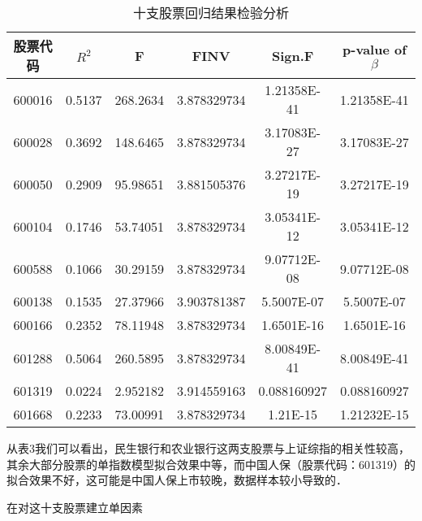 \begin{table}[ht]
\centering
\caption{十支股票回归结果检验分析}\label{inv9_tab3}
\begin{tabular}{|c|c|c|c|c|c|}
\hline
股票代码 & $R^{2}$ & F & FINV& Sign.F & p-value of $\beta$\\
\hline
600016 & 0.5137 & 268.2634 & 3.878329734& 1.21358E-41 & 1.21358E-41\\
\hline
600028 & 0.3692 & 148.6465 & 3.878329734 & 3.17083E-27 & 3.17083E-27\\
\hline
600050 & 0.2909 & 95.98651 &3.881505376& 3.27217E-19 & 3.27217E-19\\
\hline
600104 & 0.1746 & 53.74051 &3.878329734& 3.05341E-12 & 3.05341E-12\\
\hline
600588 & 0.1066 & 30.29159 &3.878329734& 9.07712E-08 & 9.07712E-08\\
\hline
600138 & 0.1535 & 27.37966 &3.903781387& 5.5007E-07 & 5.5007E-07\\
\hline
600166 & 0.2352 & 78.11948 &3.878329734& 1.6501E-16 & 1.6501E-16\\
\hline
601288 & 0.5064 & 260.5895 & 3.878329734&8.00849E-41 & 8.00849E-41\\
\hline
601319 & 0.0224 & 2.952182 &3.914559163& 0.088160927 & 0.088160927\\
\hline
601668 & 0.2233 & 73.00991 &3.878329734 & 1.21E-15 & 1.21232E-15\\
\hline
\end{tabular}
\end{table}

从表3我们可以看出，民生银行和农业银行这两支股票与上证综指的相关性较高，其余大部分股票的单指数模型拟合效果中等，而中国人保（股票代码：601319）的拟合效果不好，这可能是中国人保上市较晚，数据样本较小导致的．

在对这十支股票建立单因素










